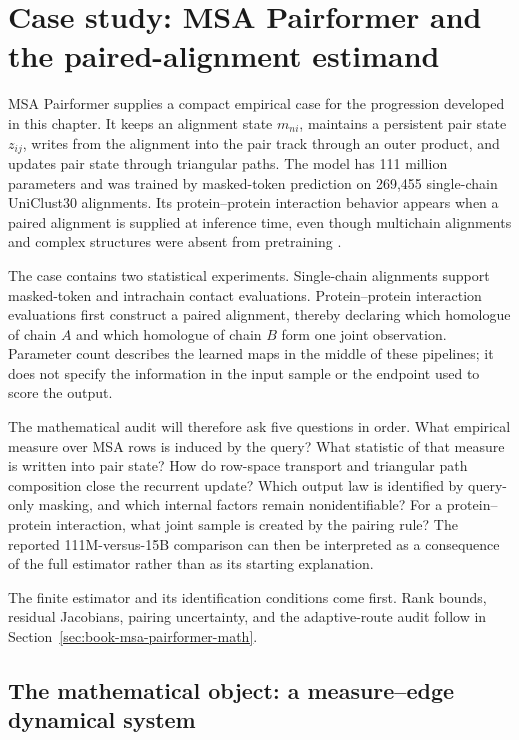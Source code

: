 \section[MSA Pairformer and the paired-alignment estimand]{Case study: MSA Pairformer and the paired-alignment estimand}

MSA Pairformer supplies a compact empirical case for the progression developed in this chapter.
It keeps an alignment state $m_{ni}$, maintains a persistent pair state $z_{ij}$, writes from the
alignment into the pair track through an outer product, and updates pair state through triangular
paths.  The model has 111 million parameters and was trained by masked-token prediction on
269,455 single-chain UniClust30 alignments.  Its protein--protein interaction behavior appears when
a paired alignment is supplied at inference time, even though multichain alignments and complex
structures were absent from pretraining \cite{akiyama2026msapairformer}.

The case contains two statistical experiments.  Single-chain alignments support masked-token and
intrachain contact evaluations.  Protein--protein interaction evaluations first construct a paired
alignment, thereby declaring which homologue of chain $A$ and which homologue of chain $B$ form one
joint observation.  Parameter count describes the learned maps in the middle of these pipelines;
it does not specify the information in the input sample or the endpoint used to score the output.

The mathematical audit will therefore ask five questions in order.  What empirical measure over
MSA rows is induced by the query?  What statistic of that measure is written into pair state?  How
do row-space transport and triangular path composition close the recurrent update?  Which output
law is identified by query-only masking, and which internal factors remain nonidentifiable?  For a
protein--protein interaction, what joint sample is created by the pairing rule?  The reported
111M-versus-15B comparison can then be interpreted as a consequence of the full estimator rather
than as its starting explanation.

The finite estimator and its identification conditions come first.  Rank bounds, residual
Jacobians, pairing uncertainty, and the adaptive-route audit follow in
Section~\ref{sec:book-msa-pairformer-math}.

\subsection{The mathematical object: a measure--edge dynamical system}

